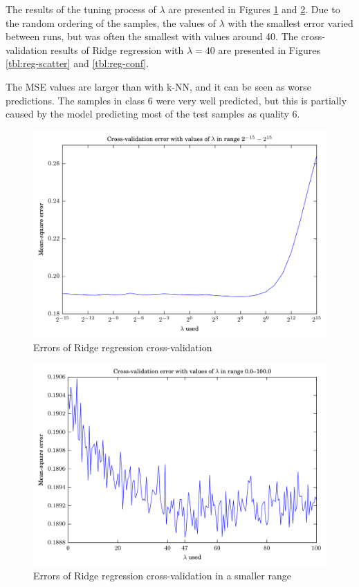 \documentclass[notitlepage]{report}
\begin{document}
The results of the tuning process of $\lambda$ are presented in Figures \ref{tbl:reg-mses-15} and \ref{tbl:reg-mses}. Due to the random ordering of the samples, the values of $\lambda$ with the smallest error varied between runs, but was often the smallest with values around 40. The cross-validation results of Ridge regression with $\lambda=40$ are presented in Figures \ref{tbl:reg-scatter} and \ref{tbl:reg-conf}.

The MSE values are larger than with k-NN, and it can be seen as worse predictions. The samples in class 6 were very well predicted, but this is partially caused by the model predicting most of the test samples as quality 6.

\begin{figure}[H]
\includegraphics[width=\textwidth]{mse_lmbd15.png}
\caption{Errors of Ridge regression cross-validation}
\label{tbl:reg-mses-15}
\end{figure}

\begin{figure}[H]
\includegraphics[width=\textwidth]{mse_lmbd.png}
\caption{Errors of Ridge regression cross-validation in a smaller range}
\label{tbl:reg-mses}
\end{figure}
\end{document}
